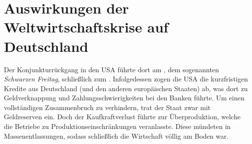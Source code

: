 \section{Auswirkungen der Weltwirtschaftskrise auf Deutschland}

Der Konjunkturrückgang in den USA führte dort am , dem sogenannten \emph{Schwarzen Freitag}, schließlich zum
. Infolgedessen zogen die USA die kurzfristigen
Kredite aus Deutschland (und den anderen europäischen Staaten) ab, was
dort zu Geldverknappung und Zahlungsschwierigkeiten bei den Banken
führte. Um einen vollständigen Zusammenbruch zu verhindern, trat der
Staat zwar mit Geldreserven ein. Doch der Kaufkraftverlust führte zur
Überproduktion, welche die Betriebe zu Produktionseinschränkungen
veranlasste. Diese mündeten in Massenentlassungen, sodass schließlich
die Wirtschaft völlig am Boden war. 

\endinput
